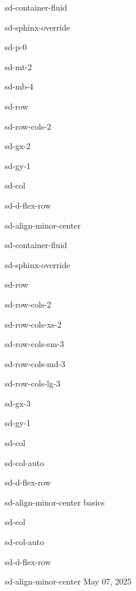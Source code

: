 \documentclass[letterpaper,10pt,english]{jupyterBook}
\begin{document}
\begin{sphinxuseclass}{sd-container-fluid}
\begin{sphinxuseclass}{sd-sphinx-override}
\begin{sphinxuseclass}{sd-p-0}
\begin{sphinxuseclass}{sd-mt-2}
\begin{sphinxuseclass}{sd-mb-4}
\begin{sphinxuseclass}{sd-row}
\begin{sphinxuseclass}{sd-row-cols-2}
\begin{sphinxuseclass}{sd-gx-2}
\begin{sphinxuseclass}{sd-gy-1}
\begin{sphinxuseclass}{sd-col}
\begin{sphinxuseclass}{sd-d-flex-row}
\begin{sphinxuseclass}{sd-align-minor-center}
\begin{sphinxuseclass}{sd-container-fluid}
\begin{sphinxuseclass}{sd-sphinx-override}
\begin{sphinxuseclass}{sd-row}
\begin{sphinxuseclass}{sd-row-cols-2}
\begin{sphinxuseclass}{sd-row-cols-xs-2}
\begin{sphinxuseclass}{sd-row-cols-sm-3}
\begin{sphinxuseclass}{sd-row-cols-md-3}
\begin{sphinxuseclass}{sd-row-cols-lg-3}
\begin{sphinxuseclass}{sd-gx-3}
\begin{sphinxuseclass}{sd-gy-1}
\begin{sphinxuseclass}{sd-col}
\begin{sphinxuseclass}{sd-col-auto}
\begin{sphinxuseclass}{sd-d-flex-row}
\begin{sphinxuseclass}{sd-align-minor-center}
\sphinxAtStartPar
basics

\end{sphinxuseclass}
\end{sphinxuseclass}
\end{sphinxuseclass}
\end{sphinxuseclass}
\begin{sphinxuseclass}{sd-col}
\begin{sphinxuseclass}{sd-col-auto}
\begin{sphinxuseclass}{sd-d-flex-row}
\begin{sphinxuseclass}{sd-align-minor-center}
\sphinxAtStartPar
May 07, 2025


\end{sphinxuseclass}
\end{sphinxuseclass}
\end{sphinxuseclass}
\end{sphinxuseclass}
\end{sphinxuseclass}
\end{sphinxuseclass}
\end{sphinxuseclass}
\end{sphinxuseclass}
\end{sphinxuseclass}
\end{sphinxuseclass}
\end{sphinxuseclass}
\end{sphinxuseclass}
\end{sphinxuseclass}
\end{sphinxuseclass}
\end{sphinxuseclass}
\end{sphinxuseclass}
\end{sphinxuseclass}
\end{sphinxuseclass}
\end{sphinxuseclass}
\end{sphinxuseclass}
\end{sphinxuseclass}
\end{sphinxuseclass}
\end{sphinxuseclass}
\end{sphinxuseclass}
\end{sphinxuseclass}
\end{sphinxuseclass}
\end{document}
